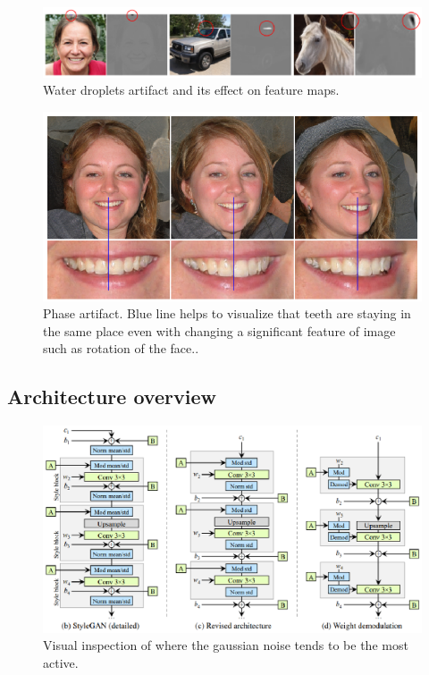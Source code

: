 \documentclass[12pt,a4paper,openany]{book}
\begin{document}
\begin{figure}[ht!]
    \centering
    \includegraphics[scale=1.0]{figs/water-droplets.eps}
    \caption{Water droplets artifact and its effect on feature maps.}\label{Fig:STYLEGAN}
\end{figure}



\begin{figure}[ht!]
    \centering
    \includegraphics[scale=1.2]{figs/phase.eps}
    \caption{Phase artifact. Blue line helps to visualize that teeth are staying in the same place even with changing a significant feature of image such as rotation of the face..}\label{Fig:STYLEGAN}
\end{figure}

\subsection{Architecture overview}

\begin{figure}[ht!]
    \centering
    \includegraphics[scale=1.0]{figs/stylegan2-scheme2.eps}
    \caption{Visual inspection of where the gaussian noise tends to be the most active.}\label{Fig:STYLEGAN}
\end{figure}
\end{document}
